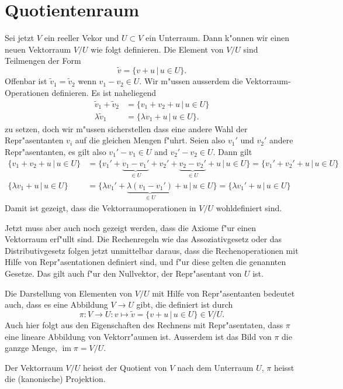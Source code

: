 \section{Quotientenraum}
Sei jetzt $V$ ein reeller Vekor und $U\subset V$ ein Unterraum.
Dann k"onnen wir einen neuen Vektorraum $V/U$ wie folgt definieren.
Die Element von $V/U$ sind Teilmengen der Form
\[
\tilde v = \{v+u\,|\, u\in U\}.
\]
Offenbar ist $\tilde v_1=\tilde v_2$ wenn $v_1-v_2\in U$.
Wir m"ussen ausserdem die Vektorraum-Operationen definieren.
Es ist naheliegend
\begin{align*}
\tilde v_1+\tilde v_2
&=
\{ v_1+v_2+u\,|\, u\in U\}
\\
\lambda \tilde v_1
&=
\{\lambda v_1+u\,|\, u\in U\}.
\end{align*}
zu setzen, doch wir m"ussen sicherstellen dass eine andere Wahl
der Repr"asentanten $v_i$ auf die gleichen Mengen f"uhrt.
Seien also $v_1'$ und $v_2'$ andere Repr"asentanten, es gilt also
$v_1'-v_1\in U$ and $v_2'-v_2\in U$.
Dann gilt
\begin{align*}
\{v_1 + v_2 + u\,|\, u\in U\}
&=
\{v_1' + \underbrace{v_1-v_1'}_{\displaystyle\in U}
+ v_2' + \underbrace{v_2-v_2'}_{\displaystyle\in U}
+ u\,|\, u\in U\} = \{v_1'+v_2'+u\,|\, u\in U\}
\\
\{\lambda v_1 + u\,|\, u\in U\}
&=
\{\lambda v_1' + \underbrace{\lambda(v_1-v_1')}_{\displaystyle \in U}+u
\,|\, u\in U\}
=
\{\lambda v_1' + u\,|\, u\in U\}
\end{align*}
Damit ist gezeigt, dass die Vektorraumoperationen in $V/U$ wohldefiniert
sind.

Jetzt muss aber auch noch gezeigt werden, dass die Axiome f"ur einen
Vektorraum erf"ullt sind.
Die Rechenregeln wie das Assoziativgesetz oder das Distributivgesetz
folgen jetzt unmittelbar daraus, dass die Rechenoperationen mit Hilfe
von Repr"asentationen definiert sind, und f"ur diese gelten die
genannten Gesetze.
Das gilt auch f"ur den Nullvektor, der Repr"asentant von $U$ ist.

Die Darstellung von Elementen von $V/U$ mit Hilfe von Repr"asentanten
bedeutet auch, dass es eine Abbildung $V\to U$ gibt, die definiert
ist durch
\[
\pi \colon V\to U: v\mapsto \tilde v=\{v+u\,|\, u\in U\}\in V/U.
\]
Auch hier folgt aus den Eigenschaften des Rechnens mit Repr"asentaten,
dass $\pi$ eine lineare Abbildung von Vektorr"aumen ist.
Ausserdem ist das Bild von $\pi$ die ganzge Menge,
$\operatorname{im}\pi = V/U$.

\begin{definition}
Der Vektorraum $V/U$ heisst der Quotient von $V$ nach dem Unterraum $U$,
$\pi$ heisst die (kanonische) Projektion.
\end{definition}

